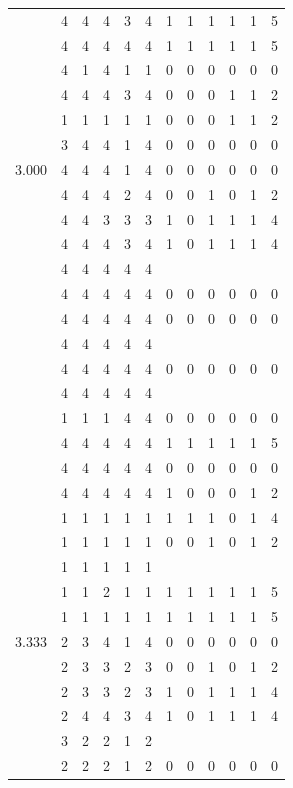 \documentclass[]{msu-thesis}
\theoremstyle{definition}
\theoremstyle{definition}
\theoremstyle{definition}
\theoremstyle{remark}
\begin{document}
\begin{table}
{\begin{tabular}[t]{rrrrrrrrrrrr}
 & 4 & 4 & 4 & 3 & 4 & 1 & 1 & 1 & 1 & 1 & 5\\
 & 4 & 4 & 4 & 4 & 4 & 1 & 1 & 1 & 1 & 1 & 5\\
 & 4 & 1 & 4 & 1 & 1 & 0 & 0 & 0 & 0 & 0 & 0\\
 & 4 & 4 & 4 & 3 & 4 & 0 & 0 & 0 & 1 & 1 & 2\\
 & 1 & 1 & 1 & 1 & 1 & 0 & 0 & 0 & 1 & 1 & 2\\
 & 3 & 4 & 4 & 1 & 4 & 0 & 0 & 0 & 0 & 0 & 0\\
3.000 & 4 & 4 & 4 & 1 & 4 & 0 & 0 & 0 & 0 & 0 & 0\\
 & 4 & 4 & 4 & 2 & 4 & 0 & 0 & 1 & 0 & 1 & 2\\
 & 4 & 4 & 3 & 3 & 3 & 1 & 0 & 1 & 1 & 1 & 4\\
 & 4 & 4 & 4 & 3 & 4 & 1 & 0 & 1 & 1 & 1 & 4\\
 & 4 & 4 & 4 & 4 & 4 &  &  &  &  &  & \\
 & 4 & 4 & 4 & 4 & 4 & 0 & 0 & 0 & 0 & 0 & 0\\
 & 4 & 4 & 4 & 4 & 4 & 0 & 0 & 0 & 0 & 0 & 0\\
 & 4 & 4 & 4 & 4 & 4 &  &  &  &  &  & \\
 & 4 & 4 & 4 & 4 & 4 & 0 & 0 & 0 & 0 & 0 & 0\\
 & 4 & 4 & 4 & 4 & 4 &  &  &  &  &  & \\
 & 1 & 1 & 1 & 4 & 4 & 0 & 0 & 0 & 0 & 0 & 0\\
 & 4 & 4 & 4 & 4 & 4 & 1 & 1 & 1 & 1 & 1 & 5\\
 & 4 & 4 & 4 & 4 & 4 & 0 & 0 & 0 & 0 & 0 & 0\\
 & 4 & 4 & 4 & 4 & 4 & 1 & 0 & 0 & 0 & 1 & 2\\
 & 1 & 1 & 1 & 1 & 1 & 1 & 1 & 1 & 0 & 1 & 4\\
 & 1 & 1 & 1 & 1 & 1 & 0 & 0 & 1 & 0 & 1 & 2\\
 & 1 & 1 & 1 & 1 & 1 &  &  &  &  &  & \\
 & 1 & 1 & 2 & 1 & 1 & 1 & 1 & 1 & 1 & 1 & 5\\
 & 1 & 1 & 1 & 1 & 1 & 1 & 1 & 1 & 1 & 1 & 5\\
3.333 & 2 & 3 & 4 & 1 & 4 & 0 & 0 & 0 & 0 & 0 & 0\\
 & 2 & 3 & 3 & 2 & 3 & 0 & 0 & 1 & 0 & 1 & 2\\
 & 2 & 3 & 3 & 2 & 3 & 1 & 0 & 1 & 1 & 1 & 4\\
 & 2 & 4 & 4 & 3 & 4 & 1 & 0 & 1 & 1 & 1 & 4\\
 & 3 & 2 & 2 & 1 & 2 &  &  &  &  &  & \\
 & 2 & 2 & 2 & 1 & 2 & 0 & 0 & 0 & 0 & 0 & 0\\

\end{tabular}}
\end{table}
\end{document}
